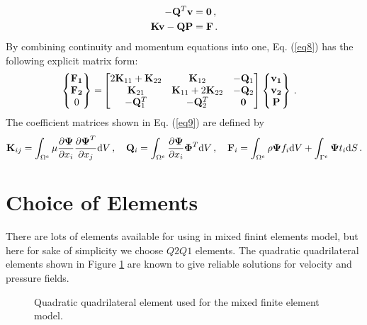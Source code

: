 \documentclass[]{article}
\begin{document}
\begin{equation}\label{eq11}
	\begin{aligned}
		-\mathbf{Q}^T \mathbf{v} &= \mathbf{0}\thinspace,\\
		\mathbf{K}\mathbf{v} - \mathbf{Q} \mathbf{P}  &= \mathbf{F}\thinspace.
	\end{aligned}
\end{equation}
By combining continuity and  momentum equations into one, Eq. (\ref{eq8}) has the following explicit matrix form:
\begin{equation}\label{eq12}
	\begin{aligned}
		\begin{Bmatrix}
			\mathbf{F_1} \\
			\mathbf{F_2}\\
			0\\
		\end{Bmatrix}
		=&\begin{bmatrix}
			2\mathbf{K}_{11} + \mathbf{K}_{22} & \mathbf{K}_{12} & -\mathbf{Q}_{1} \\
			\mathbf{K}_{21} & \mathbf{K}_{11} +2\mathbf{K}_{22} & -\mathbf{Q}_{2} \\
			-\mathbf{Q}^T_{1} & -\mathbf{Q}^T_{2}  & \mathbf{0} \\
		\end{bmatrix}
		\begin{Bmatrix}
			\mathbf{v_1} \\
			\mathbf{v_2}\\
			\mathbf{P}\\
		\end{Bmatrix}\thinspace.
	\end{aligned}
\end{equation}
The coefficient matrices shown in Eq. (\ref{eq9}) are defined by
\begin{equation}\label{eq13}
	\begin{aligned}
		\mathbf{K}_{ij} = \int_{\Omega^e} \mu \frac{\partial\boldsymbol{\Psi}}{\partial x_i} \frac{\partial\boldsymbol{\Psi}^T}{\partial x_j}\mathrm{d}V\thinspace, \quad \mathbf{Q}_i = \int_{\Omega^e}\frac{\partial\boldsymbol{\Psi}}{\partial x_i} \boldsymbol{\Phi}^T \mathrm{d}V\thinspace, \quad
		\mathbf{F}_i =\int_{\Omega^e} \rho \boldsymbol{\Psi} f_i \mathrm{d}V
		+\int_{\Gamma^e} \boldsymbol{\Psi} t_i \mathrm{d}S \thinspace.
	\end{aligned}
\end{equation}
\section{Choice of Elements} \label{sec: elem}
There are lots of elements available for using in mixed finint elements model, but here for sake of simplicity we choose $Q2Q1$ elements. The quadratic quadrilateral elements shown in Figure \ref{fig_elem} are known to give reliable solutions for velocity and pressure fields.
\begin{figure}[htbp]
	\centering
	
	\caption{Quadratic quadrilateral element used for the mixed finite element model.}
	\label{fig_elem}
\end{figure}
\end{document}
